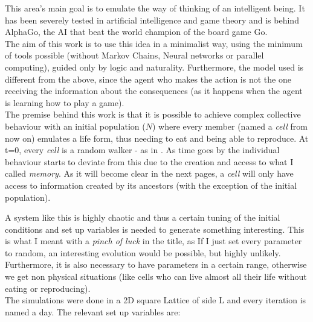 \documentclass[a4paper,prd,twocolumn,nofootinbib,superscriptaddress,floatfix]{revtex4}
\begin{document}
This area's main goal is to emulate the way of thinking of an intelligent being. It has been severely tested in artificial intelligence and game theory  and is behind AlphaGo, the AI that beat the world champion of the board game Go. \cite{go}\\
The aim of this work is to use this idea in a minimalist way, using the minimum of tools possible (without Markov Chains, Neural networks or parallel computing), guided only by logic and naturality.
Furthermore, the model used is different from the above, since the agent who makes the action is not the one receiving the information about the consequences (as it happens when the agent is learning how to play a game).\\

The premise behind this work is that it is possible to achieve complex collective behaviour with an initial population ($N$) where every member (named a \textit{cell} from now on) emulates a life form, thus needing to eat and being able to reproduce. At t=0, every \textit{cell} is a random walker - as in \cite{randwalk}. As time goes by the individual behaviour starts to deviate from this due to the creation and access to what I called \textit{memory}.  As it will become clear in the next pages,  a \textit{cell} will only have access to information created by its ancestors (with the exception of the initial population). 

A system like this is highly chaotic and thus a certain tuning of the initial conditions and set up variables is needed to generate something interesting. This is what I meant with a \textit{pinch of luck} in the title, as If I just set every parameter to random, an interesting evolution would be possible, but highly unlikely. Furthermore, it is also necessary to have parameters in a certain range, otherwise we get non physical  situations (like cells who can live almost all their life without eating or reproducing).\\
The simulations were done in a 2D square Lattice of side L and every iteration is named a day. The relevant set up variables are:\\
\end{document}
